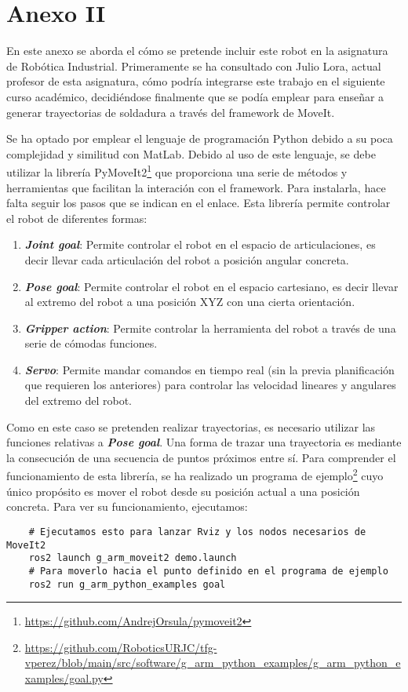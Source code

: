 \chapter*{Anexo II}
\label{cap:anexoii}

\noindent En este anexo se aborda el cómo se pretende incluir este robot en la asignatura de Robótica Industrial. Primeramente 
se ha consultado con Julio Lora, actual profesor de esta asignatura, cómo podría integrarse este trabajo en el siguiente curso académico, decidiéndose 
finalmente que se podía emplear para enseñar a generar trayectorias de soldadura a través del framework de MoveIt. 
  
   
Se ha optado por emplear el lenguaje de programación Python debido a su poca complejidad y similitud con MatLab. Debido al uso de 
este lenguaje, se debe utilizar la librería PyMoveIt2\footnote{\url{https://github.com/AndrejOrsula/pymoveit2}} que proporciona una serie de métodos y herramientas que 
facilitan la interación con el framework. Para instalarla, hace falta seguir los pasos que se indican en el enlace. Esta librería permite controlar 
el robot de diferentes formas:
\begin{enumerate}
\item \textbf{\textit{Joint goal}}: Permite controlar el robot en el espacio de articulaciones, es decir llevar cada articulación del robot a posición angular concreta.
\item \textbf{\textit{Pose goal}}: Permite controlar el robot en el espacio cartesiano, es decir llevar al extremo del robot a una posición XYZ con una 
cierta orientación.
\item \textbf{\textit{Gripper action}}: Permite controlar la herramienta del robot a través de una serie de cómodas funciones.
\item \textbf{\textit{Servo}}: Permite mandar comandos en tiempo real (sin la previa planificación que requieren los anteriores) para controlar las velocidad lineares y 
angulares del extremo del robot.

\end{enumerate}

Como en este caso se pretenden realizar trayectorias, es necesario utilizar las funciones relativas a \textbf{\textit{Pose goal}}. Una forma de trazar una 
trayectoria es mediante la consecución de una secuencia de puntos próximos entre sí. 
\newpage
Para comprender el funcionamiento de esta librería, se ha realizado un programa de ejemplo\footnote{\url{https://github.com/RoboticsURJC/tfg-vperez/blob/main/src/software/g\_arm\_python_examples/g\_arm_python\_examples/goal.py}} 
cuyo único propósito es mover el robot desde su posición actual a una posición concreta. Para ver su funcionamiento, ejecutamos: 
\begin{verbatim}
    # Ejecutamos esto para lanzar Rviz y los nodos necesarios de MoveIt2
    ros2 launch g_arm_moveit2 demo.launch 
    # Para moverlo hacia el punto definido en el programa de ejemplo
    ros2 run g_arm_python_examples goal 
\end{verbatim}

